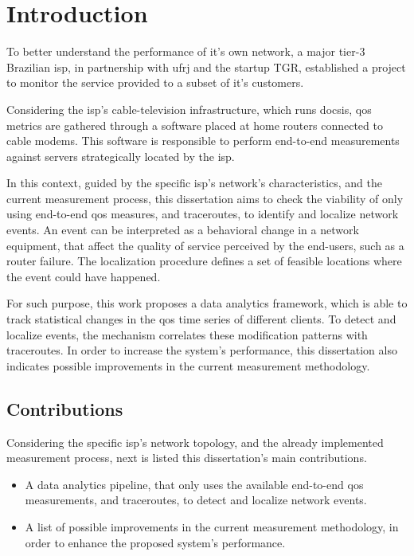 \chapter{Introduction}

To better understand the performance of it's own network, a major
tier-3 Brazilian \gls*{isp}, in partnership with \gls*{ufrj} and the startup
TGR,
established a project to monitor the service provided to a subset
of it's customers.

Considering the \gls*{isp}'s cable-television infrastructure,
which runs \gls*{docsis},
\gls*{qos} metrics are gathered through a software placed at home routers
connected to cable modems. This software is responsible to perform end-to-end
measurements against servers strategically located by the \gls*{isp}.

In this context, guided by the specific \gls*{isp}'s network's characteristics,
and the current measurement process,
this dissertation aims to check the viability of
only using end-to-end \gls*{qos} measures, and traceroutes,
to identify and localize network events. An event can be interpreted as a
behavioral change in a network equipment, that affect the quality of service
perceived by the end-users,
such as a router failure. The localization procedure defines a set of
feasible locations where the event could have happened.

For such purpose, this work proposes a data analytics framework, which is able
to track statistical changes in the \gls*{qos} time series of different
clients.
To detect and localize events, the mechanism correlates these modification
patterns with traceroutes.
In order to increase the system's performance,
this dissertation also indicates possible improvements in the current
measurement methodology.

\section{Contributions}

Considering the specific \gls*{isp}'s network topology,
and the already implemented
measurement process, next is listed this dissertation's main contributions.

\begin{itemize}
\item
A data analytics pipeline, that only uses the available end-to-end \gls*{qos}
measurements, and traceroutes, to detect and localize network events.

\item
A list of possible improvements in the current measurement methodology,
in order to enhance the proposed system's performance.

\end{itemize}

